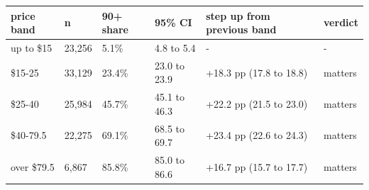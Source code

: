 \begin{tabular}{llllll}
\toprule
\textbf{price band} & \textbf{n} & \textbf{90+ share} & \textbf{95\% CI} & \textbf{step up from previous band} & \textbf{verdict} \\
\midrule
up to \$15 & 23,256 & 5.1\% & 4.8 to 5.4 & - & - \\
\$15-25 & 33,129 & 23.4\% & 23.0 to 23.9 & +18.3 pp (17.8 to 18.8) & matters \\
\$25-40 & 25,984 & 45.7\% & 45.1 to 46.3 & +22.2 pp (21.5 to 23.0) & matters \\
\$40-79.5 & 22,275 & 69.1\% & 68.5 to 69.7 & +23.4 pp (22.6 to 24.3) & matters \\
over \$79.5 & 6,867 & 85.8\% & 85.0 to 86.6 & +16.7 pp (15.7 to 17.7) & matters \\
\bottomrule
\end{tabular}
